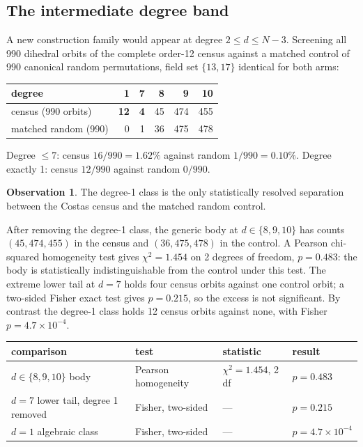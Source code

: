 \documentclass[11pt,a4paper]{article}
\theoremstyle{definition}
\newtheorem{observation}[theorem]{Observation}
\begin{document}
\subsection{The intermediate degree band}

A new construction family would appear at degree $2\le d\le N-3$. Screening all
990 dihedral orbits of the complete order-12 census against a matched control of
990 canonical random permutations, field set $\{13,17\}$ identical for both arms:

\begin{center}
\begin{tabular}{@{}lrrrrr@{}}
\toprule
degree & 1 & 7 & 8 & 9 & 10 \\
\midrule
census (990 orbits) & \textbf{12} & \textbf{4} & 45 & 474 & 455 \\
matched random (990) & 0 & 1 & 36 & 475 & 478 \\
\bottomrule
\end{tabular}
\end{center}

Degree $\le7$: census $16/990 = 1.62\%$ against random $1/990 = 0.10\%$. Degree
exactly 1: census $12/990$ against random $0/990$.

\begin{observation}
The degree-1 class is the only statistically resolved separation between the
Costas census and the matched random control.

After removing the degree-1 class, the generic body at $d\in\{8,9,10\}$ has
counts $(45,474,455)$ in the census and $(36,475,478)$ in the control. A Pearson
chi-squared homogeneity test gives $\chi^2=1.454$ on 2 degrees of freedom,
$p=0.483$: the body is statistically indistinguishable from the control under
this test. The extreme lower tail at $d=7$ holds four census orbits against one
control orbit; a two-sided Fisher exact test gives $p=0.215$, so the excess is
not significant. By contrast the degree-1 class holds 12 census orbits against
none, with Fisher $p=4.7\times10^{-4}$.
\end{observation}

\begin{center}
\begin{tabular}{@{}llll@{}}
\toprule
comparison & test & statistic & result \\
\midrule
$d\in\{8,9,10\}$ body & Pearson homogeneity & $\chi^2=1.454$, 2 df & $p=0.483$ \\
$d=7$ lower tail, degree 1 removed & Fisher, two-sided & --- & $p=0.215$ \\
$d=1$ algebraic class & Fisher, two-sided & --- & $p=4.7\times10^{-4}$ \\
\bottomrule
\end{tabular}
\end{center}
\end{document}
